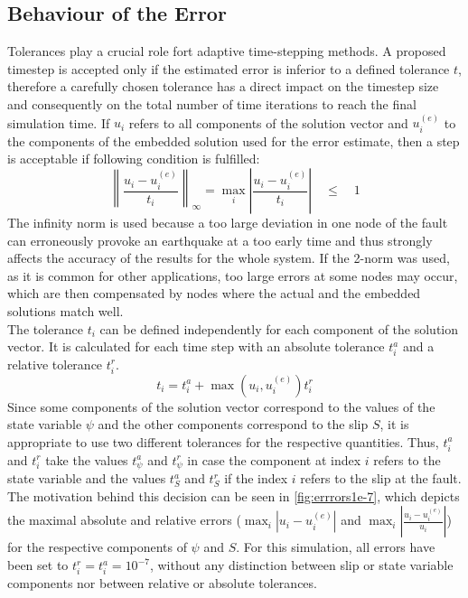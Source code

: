 \subsection{Behaviour of the Error}
Tolerances play a crucial role fort adaptive time-stepping methods. A proposed timestep is accepted only if the estimated error is inferior to a defined tolerance $t$, therefore a carefully chosen tolerance has a direct impact on the timestep size and consequently on the total number of time iterations to reach the final simulation time. If $u_i$ refers to all components of the solution vector and $u_i^{(e)}$ to the components of the embedded solution used for the error estimate, then a step is acceptable if following condition is fulfilled: 
\begin{equation}
    \left\|\frac{u_i - u_i^{(e)}}{t_i}\right\|_\infty = \max_i \left|\frac{u_i - u_i^{(e)}}{t_i}\right|
    \quad \leq \quad 1
\end{equation}
The infinity norm is used because a too large deviation in one node of the fault can erroneously provoke an earthquake at a too early time and thus strongly affects the accuracy of the results for the whole system. If the 2-norm was used, as it is common for other applications, too large errors at some nodes may occur, which are then compensated by nodes where the actual and the embedded solutions match well. \\
The tolerance $t_i$ can be defined independently for each component of the solution vector. It is calculated for each time step with an absolute tolerance $t_i^a$ and a relative tolerance $t_i^r$. 
\begin{equation}
    t_i = t_i^a + \max\left(u_i,u_i^{(e)}\right)t_i^r
\end{equation}
Since some components of the solution vector correspond to the values of the state variable $\psi$ and the other components correspond to the slip $S$, it is appropriate to use two different tolerances for the respective quantities. Thus, $t_i^a$ and $t_i^r$ take the values $t_\psi^a$ and $t_\psi^r$ in case the component at index $i$ refers to the state variable and the values $t_S^a$ and $t_S^r$ if the index $i$ refers to the slip at the fault. The motivation behind this decision can be seen in \autoref{fig:errrors1e-7}, which depicts the maximal absolute and relative errors ($\max_i\left|u_i-u_i^{(e)}\right|$ and $\max_i\left|\frac{u_i-u_i^{(e)}}{u_i}\right|$) for the respective components of $\psi$ and $S$. For this simulation, all errors have been set to $t_i^r = t_i^a = 10^{-7}$, without any distinction between slip or state variable components nor between relative or absolute tolerances.
